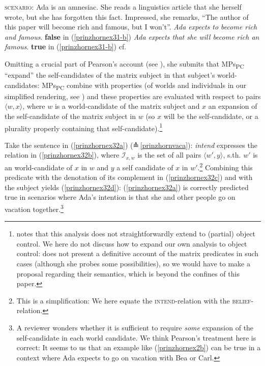\documentclass[output=paper,colorlinks,citecolor=brown,
]{langscibook}
\begin{document}
\ea 
\ea  \textsc{scenario:} Ada is an amnesiac. She reads a linguistics article that she herself wrote, but she has forgotten this fact. Impressed, she remarks, “The author of this paper will become rich and famous, but I won't”. \label{prinzhornex31-b}
\ex  \textit{Ada expects to become rich and famous}. \hfill \textbf{false} in (\ref{prinzhornex31-b}) \label{prinzhornex31-c}
\ex \textit{Ada expects that she will become rich an famous}.  \hfill \textbf{true} in (\ref{prinzhornex31-b})
\newline \phantom{.}\hfill cf. \cite[(9)]{Pearson:2016} \label{prinzhornex31-d}
\z\z 

Omitting a crucial part of Pearson's account (see ), she submits that MPs\textsubscript{PC} “expand” the self-candidates of the matrix subject in that subject's world-candidates: MPs\textsubscript{PC} combine with properties (of worlds and individuals in our simplified rendering, see \citealt{Chierchia:1989}) and these properties are evaluated with respect to pairs $\langle w, x \rangle$, where $w$ is a world-candidate of the matrix subject and $x$ an expansion of the self-candidate of the matrix subject in $w$ (so $x$ will be the self-candidate, or a plurality properly containing that self-candidate).\footnote{\cite{Pearson:2016} notes that this analysis does not straightforwardly extend to (partial) object control. We here do not discuss how to expand our own analysis to object control: \cite{Pearson:2016} does not present a definitive account of the matrix predicates in such cases (although she probes some possibilities), so we would have to make a proposal regarding their semantics, which is beyond the confines of this paper.}

Take the sentence in (\ref{prinzhornex32a}) (≙\,\ref{prinzhornvaca}): \textit{intend} expresses the relation in (\ref{prinzhornex32b}), where  $\mathcal{I}_{x,w}$ is the set of all pairs $\langle w',y \rangle$, s.th. $w'$ is an world-candidate of $x$ in $w$ and $y$ a self candidate of $x$ in $w'$.\footnote{This is a simplification: We here equate the \textsc{intend}-relation with the \textsc{belief}-relation.} Combining this predicate with the denotation of its complement in (\ref{prinzhornex32c}) and with the subject yields (\ref{prinzhornex32d}): (\ref{prinzhornex32a}) is correctly predicted true in scenarios where Ada's intention is that she and other people  go on vacation together.\footnote{A reviewer wonders whether it is sufficient to require \textit{some} expansion of the self-candidate in each world candidate. We think Pearson's treatment here is correct: It seems to us that an example like (\ref{prinzhornex2b}) can be true in a context where Ada expects to go on vacation with Bea or Carl.}
\end{document}
